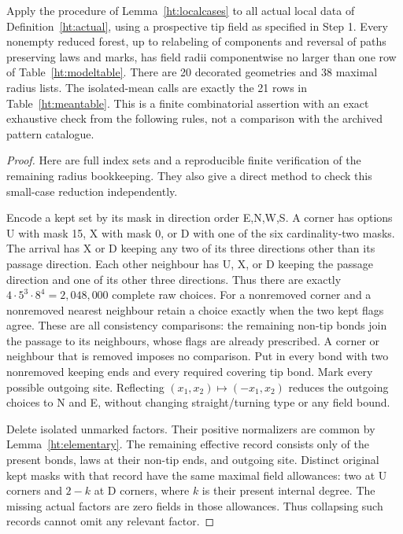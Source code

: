 \begin{htlem}
\label{ht:coverage}
Apply the procedure of Lemma~\ref{ht:localcases} to all actual local
data of Definition~\ref{ht:actual}, using a prospective tip field as
specified in Step 1. Every nonempty reduced forest, up to relabeling
of components and reversal of paths preserving laws and marks, has
field radii componentwise no larger than one row of
Table~\ref{ht:modeltable}. There are 20 decorated geometries and
38 maximal radius lists. The isolated-mean calls are exactly the 21
rows in Table~\ref{ht:meantable}. This is a finite combinatorial
assertion with an exact exhaustive check from the following rules,
not a comparison with the archived pattern catalogue.
\end{htlem}
\begin{proof}
Here are full index sets and a reproducible finite verification of the
remaining radius bookkeeping. They also give a direct method to check
this small-case reduction independently.

Encode a kept set by its mask in direction order E,N,W,S. A corner has
options U with mask 15, X with mask 0, or D with one of the six
cardinality-two masks. The arrival has X or D keeping any two of its
three directions other than its passage direction. Each other neighbour
has U, X, or D keeping the passage direction and one of its other three
directions. Thus there are exactly
\(4\cdot5^3\cdot8^4=2,048,000\) complete raw choices. For a nonremoved
corner and a nonremoved nearest neighbour retain a choice exactly when
the two kept flags agree. These are all consistency comparisons: the
remaining non-tip bonds join the passage to its neighbours, whose flags
are already prescribed. A corner or neighbour that is removed imposes
no comparison. Put in every bond with two nonremoved keeping ends and
every required covering tip bond. Mark every possible outgoing site.
Reflecting \((x_1,x_2)\mapsto(-x_1,x_2)\) reduces the outgoing choices
to N and E, without changing straight/turning type or any field bound.

Delete isolated unmarked factors. Their positive normalizers are common
by Lemma~\ref{ht:elementary}. The remaining effective record consists
only of the present bonds, laws at their non-tip ends, and outgoing
site. Distinct original kept masks with that record have the same
maximal field allowances: two at U corners and \(2-k\) at D corners,
where \(k\) is their present internal degree. The missing actual
factors are zero fields in those allowances. Thus collapsing such
records cannot omit any relevant factor.


\end{proof}
